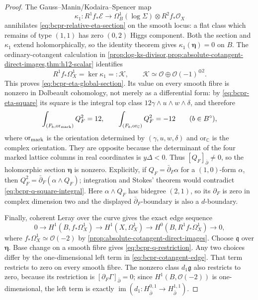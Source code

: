 \begin{proof}
The Gauss--Manin/Kodaira--Spencer map
\[
 \kappa_1\colon R^1f_*\mathcal E\longrightarrow
 \Omega_B^1(\log\Sigma)\otimes R^2f_*\mathcal O_X
\]
annihilates \cref{eq:bcpr-relative-eta-section} on the smooth locus: a
flat class which remains of type $(1,1)$ has zero $(0,2)$ Higgs component.
Both the section and $\kappa_1$ extend holomorphically, so the identity
theorem gives $\kappa_1(\boldsymbol\eta)=0$ on $B$.  The ordinary-cotangent
calculation in
\cref{prop:log-ks-divisor,prop:absolute-cotangent-direct-images,thm:h12-scalar}
identifies
\begin{equation}
 R^1f_*\Omega_X^1=\ker\kappa_1=:\mathcal K,
 \qquad
 \mathcal K\simeq\mathcal O\oplus\mathcal O(-1)^{\oplus2}.
\label{eq:bcpr-cotangent-kernel}
\end{equation}
This proves \cref{eq:bcpr-eta-global-section}.  Its value on every smooth
fibre is nonzero in Dolbeault cohomology, not merely as a differential form:
by \cref{eq:bcpr-eta-square} its square is the integral top class
$12\gamma\wedge u\wedge w\wedge\delta$, and therefore
\begin{equation}
 \int_{(F_b,\mathrm{or}_{\rm mark})}Q_F^2=12,
 \qquad
 \int_{(F_b,\mathrm{or}_{\mathbb C})}Q_F^2=-12
\qquad(b\in B^\circ),
\label{eq:bcpr-q-square-integral}
\end{equation}
where $\mathrm{or}_{\rm mark}$ is the orientation determined by
$(\gamma,u,w,\delta)$ and $\mathrm{or}_{\mathbb C}$ is the complex
orientation.  They are opposite because the determinant of the four marked
lattice columns in real coordinates is $y\Delta<0$.  Thus
$[Q_F]_{\bar\partial}\ne0$, so the holomorphic
section $\boldsymbol\eta$ is nonzero.  Explicitly, if
$Q_F=\bar\partial_F\alpha$ for a $(1,0)$-form $\alpha$, then
$Q_F^2=\bar\partial_F(\alpha\wedge Q_F)$; integration and Stokes' theorem
would contradict \cref{eq:bcpr-q-square-integral}.  Here
$\alpha\wedge Q_F$ has bidegree $(2,1)$, so its $\partial_F$ is zero in
complex dimension two and the displayed $\bar\partial_F$-boundary is also a
$d$-boundary.

Finally, coherent Leray over the curve gives the exact edge sequence
\begin{equation}
 0\longrightarrow H^1(B,f_*\Omega_X^1)
 \longrightarrow H^1(X,\Omega_X^1)
 \longrightarrow H^0(B,R^1f_*\Omega_X^1)
 \longrightarrow0,
\label{eq:bcpr-cotangent-edge}
\end{equation}
where $f_*\Omega_X^1\simeq\mathcal O(-2)$ by
\cref{prop:absolute-cotangent-direct-images}.  Choose $\mathfrak q$ over
$\boldsymbol\eta$.  Base change on a smooth fibre gives
\cref{eq:bcpr-q-restriction}.  Any two choices differ by the
one-dimensional left term in \cref{eq:bcpr-cotangent-edge}.  That term
restricts to zero on every smooth fibre.  The nonzero class
$d_1\mathfrak g$ also restricts to zero, because its restriction is
$[\partial_F\Gamma]_{\bar\partial}=0$; since
$H^1(B,\mathcal O(-2))$ is one-dimensional, the left term is exactly
$\operatorname{im}(d_1\colon H^{0,1}_{\bar\partial}\to
H^{1,1}_{\bar\partial})$.
\end{proof}

